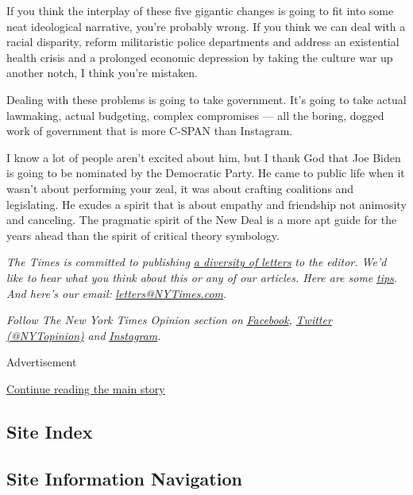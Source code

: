 If you think the interplay of these five gigantic changes is going to
fit into some neat ideological narrative, you're probably wrong. If you
think we can deal with a racial disparity, reform militaristic police
departments and address an existential health crisis and a prolonged
economic depression by taking the culture war up another notch, I think
you're mistaken.

Dealing with these problems is going to take government. It's going to
take actual lawmaking, actual budgeting, complex compromises --- all the
boring, dogged work of government that is more C-SPAN than Instagram.

I know a lot of people aren't excited about him, but I thank God that
Joe Biden is going to be nominated by the Democratic Party. He came to
public life when it wasn't about performing your zeal, it was about
crafting coalitions and legislating. He exudes a spirit that is about
empathy and friendship not animosity and canceling. The pragmatic spirit
of the New Deal is a more apt guide for the years ahead than the spirit
of critical theory symbology.

\emph{The Times is committed to publishing}
\href{https://www.nytimes3xbfgragh.onion/2019/01/31/opinion/letters/letters-to-editor-new-york-times-women.html}{\emph{a
diversity of letters}} \emph{to the editor. We'd like to hear what you
think about this or any of our articles. Here are some}
\href{https://help.nytimes3xbfgragh.onion/hc/en-us/articles/115014925288-How-to-submit-a-letter-to-the-editor}{\emph{tips}}\emph{.
And here's our email:}
\href{mailto:letters@NYTimes.com}{\emph{letters@NYTimes.com}}\emph{.}

\emph{Follow The New York Times Opinion section on}
\href{https://www.facebookcorewwwi.onion/nytopinion}{\emph{Facebook}}\emph{,}
\href{http://twitter.com/NYTOpinion}{\emph{Twitter (@NYTopinion)}}
\emph{and}
\href{https://www.instagram.com/nytopinion/}{\emph{Instagram}}\emph{.}

Advertisement

\protect\hyperlink{after-bottom}{Continue reading the main story}

\hypertarget{site-index}{%
\subsection{Site Index}\label{site-index}}

\hypertarget{site-information-navigation}{%
\subsection{Site Information
Navigation}\label{site-information-navigation}}

